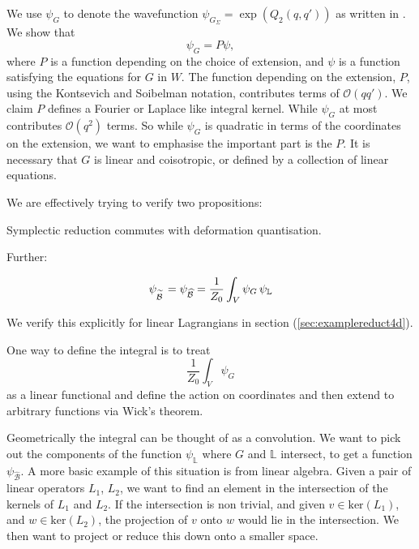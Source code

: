     \begin{rem}
    We use \( \psi_G\) to denote the wavefunction \(  \psi_{G_\Sigma} =\exp(Q_2(q,q')) \) as written in \cite[p. 53]{ks_airy}. We show that 
    \begin{equation} 
    \label{eqn:psiextg}
    \psi_G = P \psi,
    \end{equation} 
    where \(P\) is a function depending on the choice of extension, and \( \psi\) is a function satisfying the equations for \(G\) in \(W\). The function depending on the extension, \(P\), using the Kontsevich and Soibelman notation, contributes terms of \( \mathcal{O}( q q')\). We claim \(P\) defines a Fourier or Laplace like integral kernel. While \( \psi_G\) at most contributes \(\mathcal{O}(q^2)\) terms. So while \( \psi_G\) is quadratic in terms of the coordinates on the extension, we want to emphasise the important part is the \(P\). It is necessary that \(G\) is linear and coisotropic, or defined by a collection of linear equations. 
    \end{rem}
    
    
    We are effectively trying to verify two propositions:
    \begin{prop}
    Symplectic reduction commutes with deformation quantisation.
    \end{prop}
    Further:
    \begin{prop}
    \[ \psi_{\overset{\sim}{\mathcal{B}\,}} = \psi_{\widehat{\mathcal{B}}} =\frac{1}{Z_0} \int_{V} \psi_G \,  \psi_{\mathbb{L}}\]
    \end{prop}
    We verify this explicitly for linear Lagrangians in section (\ref{sec:examplereduct4d}).

    One way to define the integral is to treat 
    \[ \frac{1}{Z_0} \int_{V} \psi_G\]
    as a linear functional and define the action on coordinates and then extend to arbitrary functions via Wick's theorem. 
    
    Geometrically the integral can be thought of as a convolution. We want to pick out the components of the function \( \psi_{\mathbb{L}}\) where \(G\) and \( \mathbb{L}\) intersect, to get a function \( \psi_{\widehat{\mathcal{B}}}\). A more basic example of this situation is from linear algebra. Given a pair of linear operators \(L_1\), \(L_2\), we want to find an element in the intersection of the kernels of \(L_1\) and \(L_2\). If the intersection is non trivial, and given \( v \in \mathrm{ker}(L_1)\), and \( w \in \mathrm{ker}(L_2)\), the projection of \(v\) onto \(w\) would lie in the intersection. We then want to project or reduce this down onto a smaller space.
    
